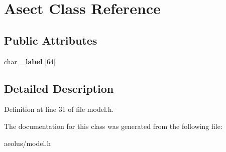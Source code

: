 \hypertarget{class_asect}{}\section{Asect Class Reference}
\label{class_asect}
\subsection*{Public Attributes}
\begin{DoxyCompactItemize}
\item 
\mbox{\label{class_asect_a679be9c59419eb3ef0f9791fd5821273}} 
char {\bfseries \+\_\+label} \mbox{[}64\mbox{]}
\end{DoxyCompactItemize}


\subsection{Detailed Description}


Definition at line 31 of file model.\+h.



The documentation for this class was generated from the following file\+:\begin{DoxyCompactItemize}
\item 
aeolus/model.\+h\end{DoxyCompactItemize}
